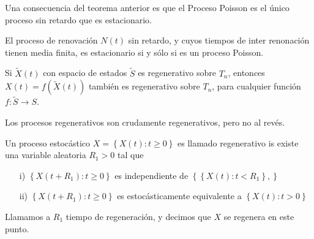 \begin{Note}
Una consecuencia del teorema anterior es que el Proceso Poisson es el \'unico proceso sin retardo que es estacionario.
\end{Note}

\begin{Coro}
El proceso de renovaci\'on $N\left(t\right)$ sin retardo, y cuyos tiempos de inter renonaci\'on tienen media finita, es estacionario si y s\'olo si es un proceso Poisson.

\end{Coro}





\begin{Note}
Si $\tilde{X}\left(t\right)$ con espacio de estados $\tilde{S}$ es regenerativo sobre $T_{n}$, entonces $X\left(t\right)=f\left(\tilde{X}\left(t\right)\right)$ tambi\'en es regenerativo sobre $T_{n}$, para cualquier funci\'on $f:\tilde{S}\rightarrow S$.
\end{Note}

\begin{Note}
Los procesos regenerativos son crudamente regenerativos, pero no al rev\'es.
\end{Note}
\begin{Def}
Un proceso estoc\'astico $X=\left\{X\left(t\right):t\geq0\right\}$ es llamado regenerativo is existe una variable aleatoria $R_{1}>0$ tal que
\begin{itemize}
\item[i)] $\left\{X\left(t+R_{1}\right):t\geq0\right\}$ es independiente de $\left\{\left\{X\left(t\right):t<R_{1}\right\},\right\}$
\item[ii)] $\left\{X\left(t+R_{1}\right):t\geq0\right\}$ es estoc\'asticamente equivalente a $\left\{X\left(t\right):t>0\right\}$
\end{itemize}

Llamamos a $R_{1}$ tiempo de regeneraci\'on, y decimos que $X$ se regenera en este punto.
\end{Def}

